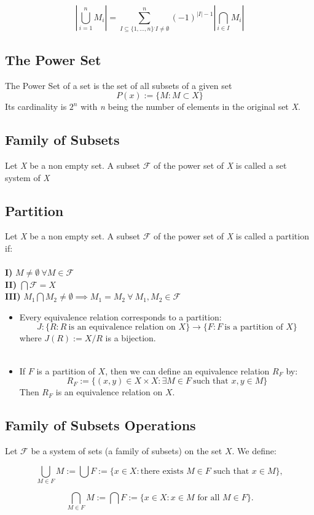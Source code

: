 \[
\left\vert \bigcup_{i = 1}^n M_i \right\vert  = \sum_{I \subseteq \{1, \dots, n\}^, I \neq \emptyset}^n (-1)^{|I| - 1} \left\vert \bigcap_{i \in I} M_i \right\vert
\]

\subsection{The Power Set}
The Power Set of a set is the set of all subsets of a given set \[
P(x):= \{ M: M \subset X\}
\]
Its cardinality is $2^n$ with \textit{n} being the number of elements in the original set \textit{X}.

\subsection{Family of Subsets}
Let \textit{X} be a non empty set. A subset $\mathscr{F}$ of the power set of \textit{X} is called a set system of \textit{X}

\subsection{Partition}
Let \textit{X} be a non empty set. A subset $\mathscr{F}$ of the power set of \textit{X} is called a partition if:\\\\
\textbf{I)} $M \neq  \emptyset\ \forall M \in \mathscr{F}$\\
\textbf{II)} $\bigcap \mathscr{F} = X$\\
\textbf{III)} $M_1 \bigcap M_2 \ne \emptyset \implies M_1 = M_2\ \forall\ M_1, M_2 \in \mathscr{F} $ 

\begin{itemize}
    
    \item Every equivalence relation corresponds to a partition:  
    \[
    J: \{ R : R\ \text{is an equivalence relation on } X\} \to \{ F: F\ \text{is a partition of } X\}
    \]
    where \( J(R) := X / R \) is a bijection.\\\\
    
    \item If \( F \) is a partition of \( X \), then we can define an equivalence relation \( R_F \) by:  
    \[
    R_F := \{ (x, y) \in X \times X : \exists M \in F\ \text{such that } x, y \in M \}
    \]
    Then \( R_F \) is an equivalence relation on \( X \).
    
\end{itemize}


\subsection{Family of Subsets Operations}
Let $\mathscr{F}$ be a system of sets (a family of subsets) on the set \( X \). We define:

\[
\bigcup_{M \in F} M := \bigcup F := \{ x \in X : \text{there exists } M \in F \text{ such that } x \in M \} ,
\]

\[
\bigcap_{M \in F} M := \bigcap F := \{ x \in X : x \in M \text{ for all } M \in F \} .
\]

\newpage